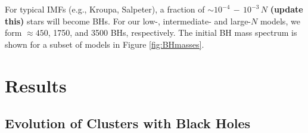 \documentclass[12pt,preprint]{aastex}
\begin{document}
For typical IMFs (e.g., Kroupa, Salpeter), a fraction of $\sim 10^{-4}\, - \,10^{-3} \, N$ \textbf{(update this)}
stars will become BHs. For our low-, intermediate- and large-$N$ models, 
we form $\approx 450$, 1750, and 3500 BHs, respectively. The initial BH mass spectrum
is shown for a subset of models in Figure \ref{fig:BHmasses}. 








\section{Results}

\subsection{Evolution of Clusters with Black Holes}
\end{document}
